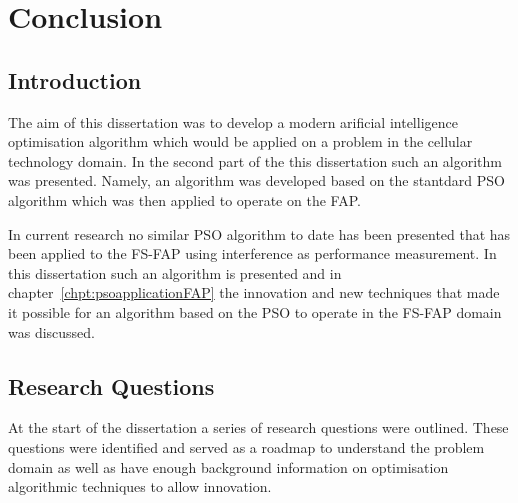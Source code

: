\chapter{Conclusion}
\label{chpt:conclusion}
\section{Introduction}
The aim of this dissertation was to develop a modern arificial intelligence optimisation algorithm which would be applied on a problem in the cellular technology domain. In the second part of the this dissertation such an algorithm was presented. Namely, an algorithm was developed based on the stantdard PSO algorithm which was then applied to operate on the FAP. 

In current research no similar PSO algorithm to date has been presented that has been applied to the FS-FAP using interference as performance measurement. In this dissertation such an algorithm is presented and in chapter~\ref{chpt:psoapplicationFAP} the innovation and new techniques that made it possible for an algorithm based on the PSO to operate in the FS-FAP domain was discussed.

\section{Research Questions}
At the start of the dissertation a series of research questions were outlined. These questions were identified and served as a roadmap to understand the problem domain as well as have enough background information on optimisation algorithmic techniques to allow innovation.


